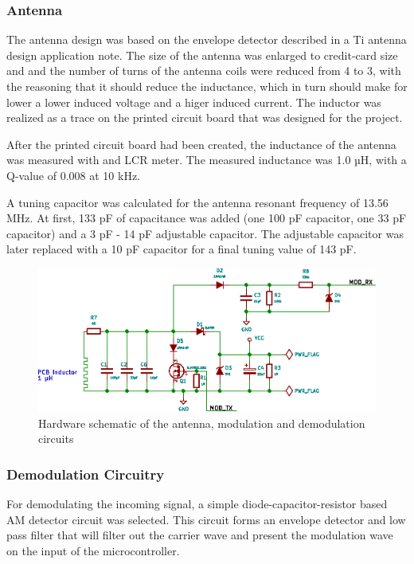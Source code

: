 \subsubsection{Antenna}
The antenna design was based on the envelope detector described in a Ti antenna design application note\cite{ti-antenna}.
The size of the antenna was enlarged to credit-card size and and the number of turns of the antenna coils were reduced from 4 to 3, with the reasoning that it should reduce the inductance, which in turn should make for lower a lower induced voltage and a higer induced current.
The inductor was realized as a trace on the printed circuit board that was designed for the project.

After the printed circuit board had been created, the inductance of the antenna was measured with and LCR meter.
The measured inductance was 1.0 µH, with a Q-value of 0.008 at 10 kHz.

A tuning capacitor was calculated for the antenna resonant frequency of 13.56 MHz.
At first, 133 pF of capacitance was added (one 100 pF capacitor, one 33 pF capacitor) and a 3 pF - 14 pF adjustable capacitor. The
adjustable capacitor was later replaced with a 10 pF capacitor for a final tuning value of 143 pF.

\begin{figure}[h!]
    \centering
    \includegraphics[scale=1.0]{res/schematic-antenna.eps}
    \caption{Hardware schematic of the antenna, modulation and demodulation circuits}
    \label{fig:sch-antenna}
\end{figure}

\subsubsection{Demodulation Circuitry}
For demodulating the incoming signal, a simple diode-capacitor-resistor based AM detector circuit was selected.
This circuit forms an envelope detector and low pass filter that will filter out the carrier wave and present the modulation wave on the input of the microcontroller.

